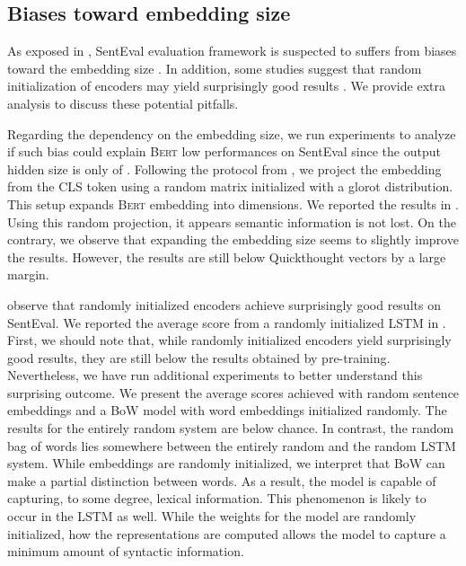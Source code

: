 
\subsection{Biases toward embedding size}

As exposed in , SentEval evaluation framework is suspected to suffers from biases toward the embedding size \parencite{eger_19}. In addition, some studies suggest that random initialization of encoders may yield surprisingly good results \parencite{wieting_19}. We provide extra analysis to discuss these potential pitfalls.

Regarding the dependency on the embedding size, we run experiments to analyze if such bias could explain \textsc{Bert} low performances on SentEval since the output hidden size is only of  . Following the protocol from \textcite{wieting_19}, we project the embedding from the \textsc{CLS} token using a random matrix initialized with a glorot distribution. This setup expands \textsc{Bert} embedding into  dimensions. We reported the results in . Using this random projection, it appears semantic information is not lost. 
On the contrary, we observe that expanding the embedding size seems to slightly improve the results.  However, the results are still below Quickthought vectors by a large margin.

\textcite{wieting_19} observe that randomly initialized encoders achieve surprisingly good results on SentEval. We reported the average score from a randomly initialized LSTM in . First, we should note that, while randomly initialized encoders yield surprisingly good results, they are still below the results obtained by pre-training. Nevertheless, we have run additional experiments to better understand this surprising outcome. We present the average scores achieved with random sentence embeddings and a BoW model with word embeddings initialized randomly. The results for the entirely random system are below chance.
In contrast, the random bag of words lies somewhere between the entirely random and the random LSTM system. While embeddings are randomly initialized, we interpret that BoW can make a partial distinction between words. As a result, the model is capable of capturing, to some degree, lexical information. This phenomenon is likely to occur in the LSTM as well. While the weights for the model are randomly initialized, how the representations are computed allows the model to capture a minimum amount of syntactic information.

